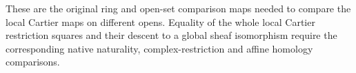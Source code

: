 These are the original ring and open-set comparison maps needed to
compare the local Cartier maps on different opens. Equality of the
whole local Cartier restriction squares and their descent to a
global sheaf isomorphism require the corresponding native naturality,
complex-restriction and affine homology comparisons.
